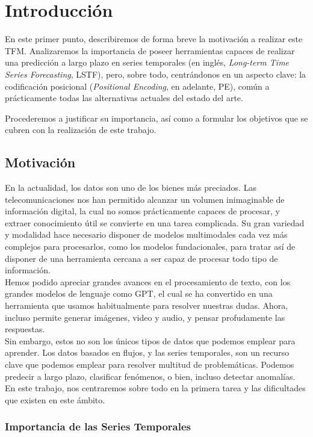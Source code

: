 \chapter{Introducción}

En este primer punto, describiremos de forma breve la motivación a realizar este TFM. Analizaremos la importancia de poseer herramientas capaces de realizar una predicción a largo plazo en series temporales (en inglés,\textit{ Long-term Time Series Forecasting},  LSTF), pero, sobre todo, centrándonos en un aspecto clave: la codificación posicional (\textit{Positional Encoding}, en adelante, PE), común a prácticamente todas las alternativas actuales del estado del arte. 

Procederemos a justificar su importancia, así como a formular los objetivos que se cubren con la realización de este trabajo.
\section{Motivación}

En la actualidad, los datos son uno de los bienes más preciados. Las telecomunicaciones nos han permitido alcanzar un volumen inimaginable de información digital, la cual no somos prácticamente capaces de procesar, y extraer conocimiento útil se convierte en una tarea complicada. Su gran variedad y modalidad hace necesario disponer de modelos multimodales cada vez más complejos para procesarlos, como los modelos fundacionales, para tratar así de disponer de una herramienta cercana a ser capaz de procesar todo tipo de información.\\

Hemos podido apreciar grandes avances en el procesamiento de texto, con los grandes modelos de lenguaje como GPT, el cual se ha convertido en una herramienta que usamos habitualmente para resolver nuestras dudas. Ahora, incluso permite generar imágenes, video y audio, y pensar profudamente las respuestas.\\

Sin embargo, estos no son los únicos tipos de datos que podemos emplear para aprender. Los datos basados en flujos, y las series temporales, son un recurso clave que podemos emplear para resolver multitud de problemáticas. Podemos predecir a largo plazo, clasificar fenómenos, o bien, incluso detectar anomalías. En este trabajo, nos centraremos sobre todo en la primera tarea y las dificultades que existen en este ámbito.

\subsection{Importancia de las Series Temporales}

